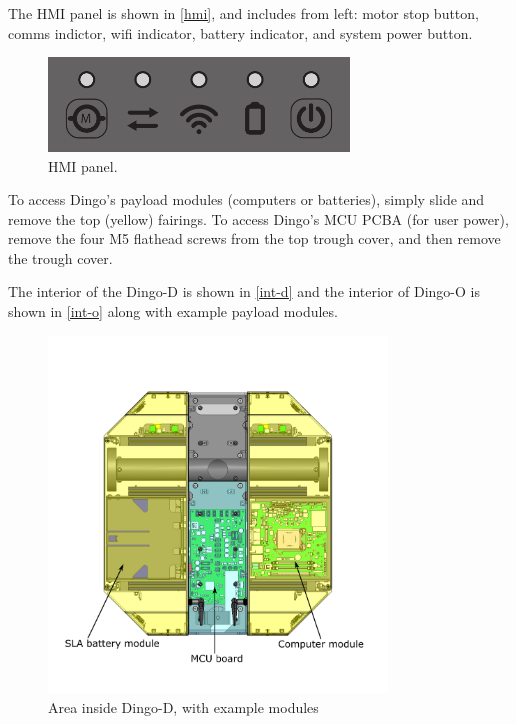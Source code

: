 \documentclass[]{clearpath-latex/clearpath-manual}
\begin{document}
The HMI panel is shown in
\autoref{hmi}, and includes from left: motor stop button, comms indictor, wifi indicator, battery
indicator, and system power button.

\begin{figure}[ht]
  \centering
  \includegraphics[width=8.0cm]{hmi.pdf}
  \caption{HMI panel.}
  \label{hmi}
\end{figure}

To access Dingo's payload modules (computers or batteries), simply slide and remove the top (yellow) fairings. To access Dingo's MCU PCBA (for user power), remove the four M5 flathead screws from the top trough cover, and then remove the trough cover.

The interior of the Dingo-D is shown in \autoref{int-d} and the interior of Dingo-O is shown in \autoref{int-o} along with example payload modules.

\begin{figure}[pt]
  \centering
  \includegraphics[width=9.0cm]{dingo-d-int.pdf}
  \caption{Area inside Dingo-D, with example modules}
  \label{int-d}
\end{figure}
\end{document}
